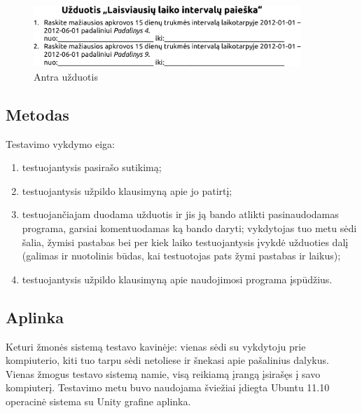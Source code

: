 \begin{figure}[H]
  \begin{center}
    \includegraphics[width=0.9\textwidth]{./4/pdfs/uzduotis2.pdf}
  \end{center}
  \caption{Antra užduotis}
  \label{fig:uzduotis_2}
\end{figure}

\subsection{Metodas}

Testavimo vykdymo eiga:
\begin{enumerate}
  \item testuojantysis pasirašo sutikimą;
  \item testuojantysis užpildo klausimyną apie jo patirtį;
  \item testuojančiajam duodama užduotis ir jis ją bando atlikti
    pasinaudodamas programa, garsiai komentuodamas ką bando daryti;
    vykdytojas tuo metu sėdi šalia, žymisi pastabas bei per kiek
    laiko testuojantysis įvykdė užduoties dalį (galimas ir nuotolinis
    būdas, kai testuotojas pats žymi pastabas ir laikus);
  \item testuojantysis užpildo klausimyną apie naudojimosi programa
    įspūdžius.
\end{enumerate}


\subsection{Aplinka}

Keturi žmonės sistemą testavo kavinėje: vienas sėdi su vykdytoju
prie kompiuterio, kiti tuo tarpu sėdi netoliese ir šnekasi apie
pašalinius dalykus. Vienas žmogus testavo sistemą namie, visą
reikiamą įrangą įsirašęs į savo kompiuterį. Testavimo metu buvo
naudojama šviežiai įdiegta Ubuntu 11.10 operacinė sistema su Unity
grafine aplinka.

